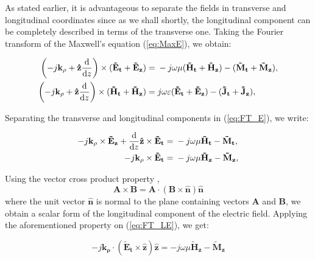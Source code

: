 \documentclass[11pt]{article}
\renewcommand{\v}[1]{\mathbf{#1}} %
\newcommand{\ti}[1]{\tilde{#1}} %
\renewcommand{\O}{\omega}  %
\renewcommand{\u}{\mu}  %
\newcommand{\x}{\times}  %
\begin{document}
  As stated earlier, it is advantageous to separate the fields in transverse and longitudinal coordinates since as we shall shortly, the longitudinal component can be completely described in terms of the transverse one. Taking the Fourier transform of the Maxwell's equation (\ref{eq:MaxE}), we obtain:

  \begin{subequations}
    \begin{align}
      \left(-j\v{k_{\rho}} + \v{\hat{z}} \dv{}{z} \right)\x (\v{\ti{E}_t} + \v{\ti{E}_z})  ={}& -j \O \u (\v{\ti{H}_t} + \v{\ti{H}_z}) -
      (\v{\ti{M}_t} + \v{\ti{M}_z}),
      \label{eq:FT_E}\\
      \left(-j\v{k_{\rho}} + \v{\hat{z}} \dv{}{z} \right)\x (\v{\ti{H}_t} + \v{\ti{H}_z})  ={}& j \O \varepsilon (\v{\ti{E}_t} + \v{\ti{E}_z}) -
      (\v{\ti{J}_t} + \v{\ti{J}_z}),
      \label{eq:FT_H}
    \end{align}
    \label{eq:FT_MaxE}
  \end{subequations}

  Separating the transverse and longitudinal components in (\ref{eq:FT_E}), we write:

  \begin{subequations}
    \begin{align}
      -j\v{k_{\rho}} \x \v{\ti{E}_z} +
      \dv{}{z}\v{\hat{z}} \x \v{\ti{E}_t} ={}&
      -j \O \u \v{\ti{H}_t} -
      \v{\ti{M}_t},
      \label{eq:FT_TE}\\
      -j\v{k_{\rho}} \x \v{\ti{E}_t} ={}&
      -j \O \u \v{\ti{H}_z} -
      \v{\ti{M}_z},
      \label{eq:FT_LE}
    \end{align}
    \label{eq:FT_TLE}
  \end{subequations}

  Using the vector cross product property \cite[p. 117]{fang2009antenna},
  \begin{equation}
    \v{A}\x\v{B} =\v{A}\cdot (\v{B} \x \v{\hat{n}})\v{\hat{n}}
    \label{eq:vec}
  \end{equation}
  where the unit vector $\v{\hat{n}}$ is normal to the plane containing vectors $\v{A}$ and $\v{B}$, we obtain a scalar form of the longitudinal component of the electric field. Applying the aforementioned property on (\ref{eq:FT_LE}), we get:

  \begin{equation}
    -j \v{k_{\rho}} \cdot (\v{\ti{E}_t} \x \v{\hat{z}})\v{\hat{z}} =
    -j \O \u \v{\ti{H}_z} - \v{\ti{M}_z}
    \label{eq:FT_sLE}
  \end{equation}
\end{document}
